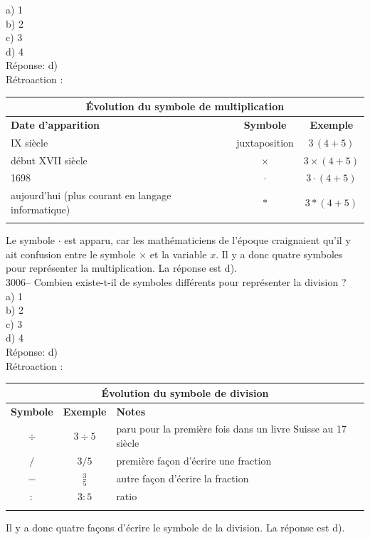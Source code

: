 \documentclass[letterpaper, 12pt]{article}
\begin{document}
a) 1\\
b) 2\\
c) 3\\
d) 4\\

R\'eponse: d)\\

R\'etroaction :\\
\begin{center}
\begin{tabular}{|l|c|c|}
\multicolumn{3}{c}{\bf \'Evolution du symbole de multiplication}\\[2mm] \hline
{\bf Date d'apparition} & {\bf Symbole} & {\bf Exemple} \\[1mm] \hline \hline
{\scriptsize IX\ieme{}} si\`ecle & juxtaposition & $3 \, (4 + 5)$ \\[1mm] \hline
d\'ebut {\scriptsize XVII\ieme{}} si\`ecle & $\times$ & $3 \times (4 + 5)$ \\[1mm] \hline
1698 & $\cdot$ & $3 \cdot (4 + 5)$ \\[1mm] \hline
aujourd'hui (plus courant en langage informatique) & $\ast$ & $3 \ast (4 + 5)$ \\[1mm] \hline
\multicolumn{3}{c}{}
\end{tabular}
\end{center}
Le symbole $\cdot$ est apparu, car les math\'ematiciens de l'\'epoque craignaient qu'il y ait confusion entre le symbole $\times$ et la variable $x$. Il y a donc quatre symboles pour repr\'esenter la multiplication. La r\'eponse est d).\\



3006-- Combien existe-t-il de symboles diff\'erents pour repr\'esenter la division ?\\

a) 1\\
b) 2\\
c) 3\\
d) 4\\

R\'eponse: d)\\

R\'etroaction :\\
\begin{center}
\begin{tabular}{|c|c|l|}
\multicolumn{3}{c}{\bf \'Evolution du symbole de division}\\[2mm] \hline
{\bf Symbole} & {\bf Exemple} & {\bf Notes} \\ \hline \hline
$\div$ & $3 \div 5$ & paru pour la premi\`ere fois dans un livre Suisse au 17\ieme{} si\`ecle \\[1mm] \hline
$/$ & $3 / 5$ & premi\`ere fa\c con d'\'ecrire une fraction\\[1mm] \hline
$-$ & $\frac{3}{5}$ & autre fa\c con d'\'ecrire la fraction \\[1mm] \hline
$:$ & $3:5$ & ratio \\[1mm] \hline
\multicolumn{3}{c}{}
\end{tabular}
\end{center}
Il y a donc quatre fa\c cons d'\'ecrire le symbole de la division. La r\'eponse est d).\\
\end{document}
